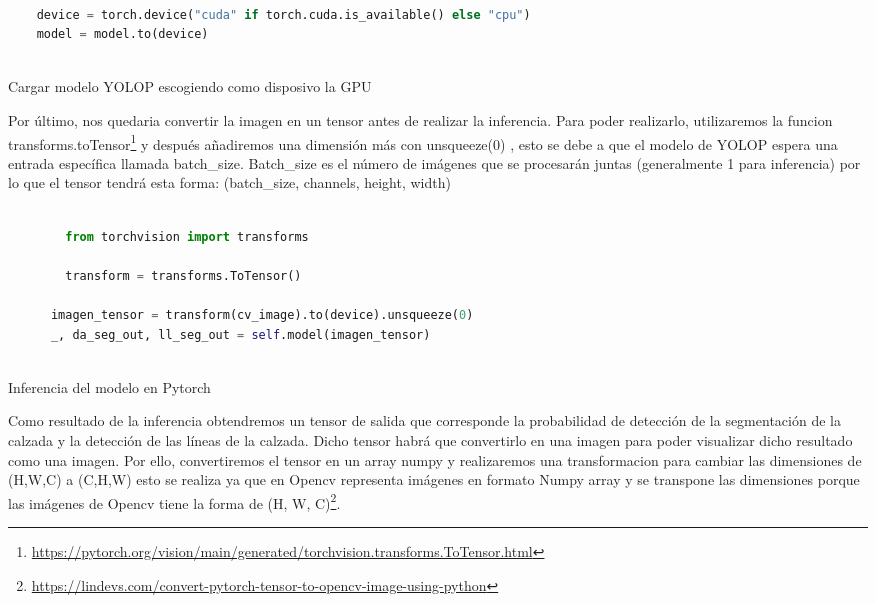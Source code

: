   
  \begin{code}[h]
    \begin{lstlisting}[language=Python]
   
    device = torch.device("cuda" if torch.cuda.is_available() else "cpu")
    model = model.to(device)
  
    \end{lstlisting}
    \caption[Cargar modelo YOLOP escogiendo como disposivo la GPU]{Cargar modelo YOLOP escogiendo como disposivo la GPU}
    \label{cod:codeloadYOLOP}
    \end{code}  

    Por último, nos quedaria convertir la imagen en un tensor antes de realizar la inferencia. Para poder realizarlo, utilizaremos la funcion transforms.toTensor\footnote{\url{https://pytorch.org/vision/main/generated/torchvision.transforms.ToTensor.html}} 
    y después añadiremos una dimensión más con unsqueeze(0) , esto se debe 
    a que el modelo de YOLOP espera una entrada específica llamada batch\_size. Batch\_size es el número de imágenes que se procesarán juntas
    (generalmente 1 para inferencia) por lo que el tensor tendrá esta forma: (batch\_size, channels, height, width)\newline

    \begin{code}[h]
      \begin{lstlisting}[language=Python]
     
        from torchvision import transforms

        transform = transforms.ToTensor() 
                    
      imagen_tensor = transform(cv_image).to(device).unsqueeze(0)
      _, da_seg_out, ll_seg_out = self.model(imagen_tensor)
    
      \end{lstlisting}
      \caption[Inferencia del modelo]{Inferencia del modelo en Pytorch}
      \label{cod:codejemplo}
      \end{code}  

    \newpage
    Como resultado de la inferencia obtendremos un tensor de salida que corresponde la probabilidad de detección de la segmentación
    de la calzada y la detección de las líneas de la calzada. Dicho tensor habrá que convertirlo en una imagen para poder visualizar
    dicho resultado como una imagen. 
    Por ello, convertiremos el tensor en un array numpy y realizaremos una transformacion para cambiar las dimensiones de (H,W,C) 
    a (C,H,W) esto se realiza ya que en Opencv representa imágenes en formato Numpy array y se transpone las dimensiones porque las
    imágenes de Opencv tiene la forma de (H, W, C)\footnote{\url{https://lindevs.com/convert-pytorch-tensor-to-opencv-image-using-python}}. 
    \newline

